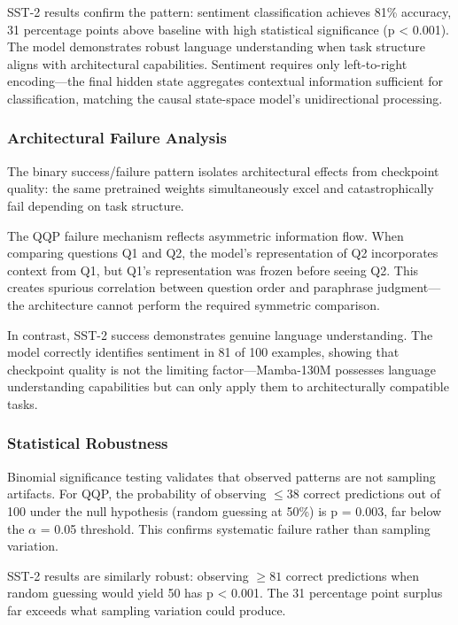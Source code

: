 SST-2 results confirm the pattern: sentiment classification achieves 81\% accuracy, 31 percentage points above baseline with high statistical significance (p < 0.001). The model demonstrates robust language understanding when task structure aligns with architectural capabilities. Sentiment requires only left-to-right encoding---the final hidden state aggregates contextual information sufficient for classification, matching the causal state-space model's unidirectional processing.

\subsubsection{Architectural Failure Analysis}

The binary success/failure pattern isolates architectural effects from checkpoint quality: the same pretrained weights simultaneously excel and catastrophically fail depending on task structure.

The QQP failure mechanism reflects asymmetric information flow. When comparing questions Q1 and Q2, the model's representation of Q2 incorporates context from Q1, but Q1's representation was frozen before seeing Q2. This creates spurious correlation between question order and paraphrase judgment---the architecture cannot perform the required symmetric comparison.

In contrast, SST-2 success demonstrates genuine language understanding. The model correctly identifies sentiment in 81 of 100 examples, showing that checkpoint quality is not the limiting factor---Mamba-130M possesses language understanding capabilities but can only apply them to architecturally compatible tasks.

\subsubsection{Statistical Robustness}

Binomial significance testing validates that observed patterns are not sampling artifacts. For QQP, the probability of observing $\leq 38$ correct predictions out of 100 under the null hypothesis (random guessing at 50\%) is p = 0.003, far below the $\alpha$ = 0.05 threshold. This confirms systematic failure rather than sampling variation.

SST-2 results are similarly robust: observing $\geq 81$ correct predictions when random guessing would yield 50 has p < 0.001. The 31 percentage point surplus far exceeds what sampling variation could produce.

